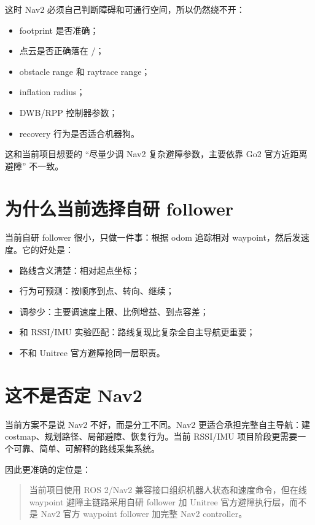 \documentclass[UTF8,a4paper,12pt]{ctexrep}
\newcommand{\code}[1]{\texttt{\detokenize{#1}}}
\begin{document}
这时 Nav2 必须自己判断障碍和可通行空间，所以仍然绕不开：

\begin{itemize}
  \item footprint 是否准确；
  \item 点云是否正确落在 \code{base_link}/\code{odom}；
  \item obstacle range 和 raytrace range；
  \item inflation radius；
  \item DWB/RPP 控制器参数；
  \item recovery 行为是否适合机器狗。
\end{itemize}

这和当前项目想要的 ``尽量少调 Nav2 复杂避障参数，主要依靠 Go2 官方近距离避障'' 不一致。

\section{为什么当前选择自研 follower}

当前自研 follower 很小，只做一件事：根据 odom 追踪相对 waypoint，然后发速度。它的好处是：

\begin{itemize}
  \item 路线含义清楚：相对起点坐标；
  \item 行为可预测：按顺序到点、转向、继续；
  \item 调参少：主要调速度上限、比例增益、到点容差；
  \item 和 RSSI/IMU 实验匹配：路线复现比复杂全自主导航更重要；
  \item 不和 Unitree 官方避障抢同一层职责。
\end{itemize}

\section{这不是否定 Nav2}

当前方案不是说 Nav2 不好，而是分工不同。Nav2 更适合承担完整自主导航：建 costmap、规划路径、局部避障、恢复行为。当前 RSSI/IMU 项目阶段更需要一个可靠、简单、可解释的路线采集系统。

因此更准确的定位是：

\begin{quote}
当前项目使用 ROS 2/Nav2 兼容接口组织机器人状态和速度命令，但在线 waypoint 避障主链路采用自研 follower 加 Unitree 官方避障执行层，而不是 Nav2 官方 waypoint follower 加完整 Nav2 controller。
\end{quote}
\end{document}
